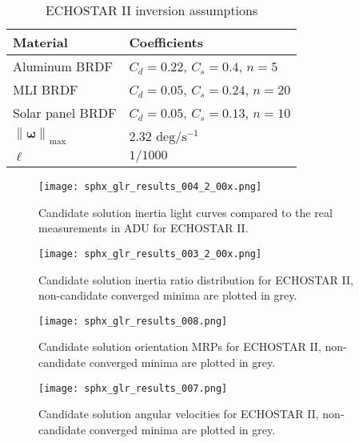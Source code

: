 \documentclass[a4paper,twocolumn]{spaceDebrisC} %
\newcommand{\vctr}[1]{\bm{#1}}
\newcommand{\norm}[1]{\left\lVert#1\right\rVert}
\newcommand{\figmed}[0]{0.4\textwidth}
\begin{document}
\begin{table}[H]
  \centering
  \caption{ECHOSTAR II inversion assumptions}
  \vspace*{6pt}
  \begin{tabular}{|l|l|}
  \hline
  \textbf{Material} & \textbf{Coefficients} \\ \hline
 Aluminum BRDF & $C_d=0.22$, $C_s=0.4$, $n=5$ \\ \hline
 MLI BRDF & $C_d=0.05$, $C_s=0.24$, $n=20$ \\ \hline
 Solar panel BRDF & $C_d=0.05$, $C_s=0.13$, $n=10$ \\ \hline
  $\norm{\vctr{\omega}}_\text{max}$ & $2.32$ $\text{deg} / \text{s}^{-1}$ \\ \hline
  $\ell$ & $1/1000$ \\ \hline
  \end{tabular}
  \label{tb:case3_ass}
\end{table}

\begin{figure*}[t]
  \centering
  \texttt{[image: sphx\_glr\_results\_004\_2\_00x.png]}
  \caption{Candidate solution inertia light curves compared to the real measurements in ADU for ECHOSTAR II.}
  \label{fig:case3_s}
\end{figure*}

\begin{figure}[H]
  \centering
  \texttt{[image: sphx\_glr\_results\_003\_2\_00x.png]}
  \caption{Candidate solution inertia ratio distribution for ECHOSTAR II, non-candidate converged minima are plotted in grey.}
  \label{fig:case3_i}
\end{figure}

\begin{figure}[H]
  \centering
  \texttt{[image: sphx\_glr\_results\_008.png]}
  \caption{Candidate solution orientation MRPs for ECHOSTAR II, non-candidate converged minima are plotted in grey.}
  \label{fig:case3_p}
\end{figure}

\begin{figure}[H]
  \centering
  \texttt{[image: sphx\_glr\_results\_007.png]}
  \caption{Candidate solution angular velocities for ECHOSTAR II, non-candidate converged minima are plotted in grey.}
  \label{fig:case3_w}
\end{figure}
\end{document}

